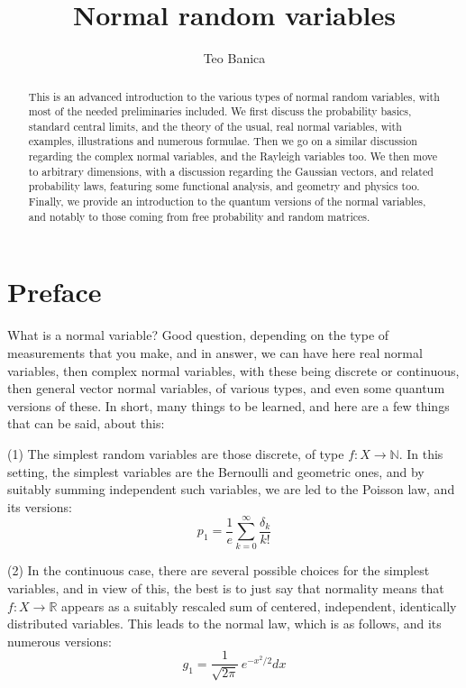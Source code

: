 \documentclass[12pt]{amsbook}
\begin{document}
\title{Normal random variables}

\author{Teo Banica}
\address{Department of Mathematics, University of Cergy-Pontoise, F-95000 Cergy-Pontoise, France. {\tt teo.banica@gmail.com}}


\begin{abstract}
This is an advanced introduction to the various types of normal random variables, with most of the needed preliminaries included. We first discuss the probability basics, standard central limits, and the theory of the usual, real normal variables, with examples, illustrations and numerous formulae. Then we go on a similar discussion regarding the complex normal variables, and the Rayleigh variables too. We then move to arbitrary dimensions, with a discussion regarding the Gaussian vectors, and related probability laws, featuring some functional analysis, and geometry and physics too. Finally, we provide an introduction to the quantum versions of the normal variables, and notably to those coming from free probability and random matrices.
\end{abstract}

\maketitle

\chapter*{Preface}

What is a normal variable? Good question, depending on the type of measurements that you make, and in answer, we can have here real normal variables, then complex normal variables, with these being discrete or continuous, then general vector normal variables, of various types, and even some quantum versions of these. In short, many things to be learned, and here are a few things that can be said, about this:

\bigskip

(1) The simplest random variables are those discrete, of type $f:X\to\mathbb N$. In this setting, the simplest variables are the Bernoulli and geometric ones, and by suitably summing independent such variables, we are led to the Poisson law, and its versions:
$$p_1=\frac{1}{e}\sum_{k=0}^\infty\frac{\delta_k}{k!}$$

(2) In the continuous case, there are several possible choices for the simplest variables, and in view of this, the best is to just say that normality means that $f:X\to\mathbb R$ appears as a suitably rescaled sum of centered, independent, identically distributed variables. This leads to the normal law, which is as follows, and its numerous versions:
$$g_1=\frac{1}{\sqrt{2\pi}}\,e^{-x^2/2}dx$$
\end{document}
